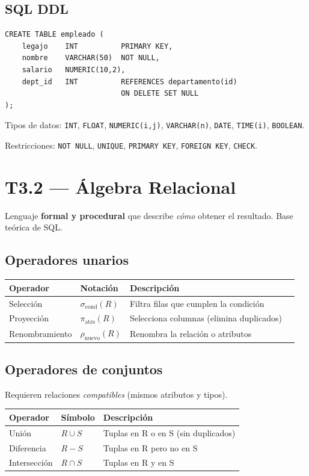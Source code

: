 \documentclass[12pt, a4paper]{article}
\begin{document}
\subsection{SQL DDL}
\begin{lstlisting}
CREATE TABLE empleado (
    legajo    INT          PRIMARY KEY,
    nombre    VARCHAR(50)  NOT NULL,
    salario   NUMERIC(10,2),
    dept_id   INT          REFERENCES departamento(id)
                           ON DELETE SET NULL
);
\end{lstlisting}

Tipos de datos: \texttt{INT}, \texttt{FLOAT}, \texttt{NUMERIC(i,j)}, \texttt{VARCHAR(n)}, \texttt{DATE}, \texttt{TIME(i)}, \texttt{BOOLEAN}.

Restricciones: \texttt{NOT NULL}, \texttt{UNIQUE}, \texttt{PRIMARY KEY}, \texttt{FOREIGN KEY}, \texttt{CHECK}.

\section{T3.2 — Álgebra Relacional}

Lenguaje \textbf{formal y procedural} que describe \textit{cómo} obtener el resultado. Base teórica de SQL.

\subsection{Operadores unarios}

\begin{tabularx}{\textwidth}{lllX}
\toprule
\textbf{Operador} & \textbf{Notación} & \textbf{Descripción} \\
\midrule
Selección    & $\sigma_{\text{cond}}(R)$ & Filtra filas que cumplen la condición \\
Proyección   & $\pi_{\text{atrs}}(R)$    & Selecciona columnas (elimina duplicados) \\
Renombramiento & $\rho_{\text{nuevo}}(R)$ & Renombra la relación o atributos \\
\bottomrule
\end{tabularx}

\subsection{Operadores de conjuntos}
Requieren relaciones \textit{compatibles} (mismos atributos y tipos).

\begin{tabularx}{\textwidth}{llX}
\toprule
\textbf{Operador} & \textbf{Símbolo} & \textbf{Descripción} \\
\midrule
Unión        & $R \cup S$ & Tuplas en R o en S (sin duplicados) \\
Diferencia   & $R - S$    & Tuplas en R pero no en S \\
Intersección & $R \cap S$ & Tuplas en R y en S \\
\bottomrule
\end{tabularx}
\end{document}
